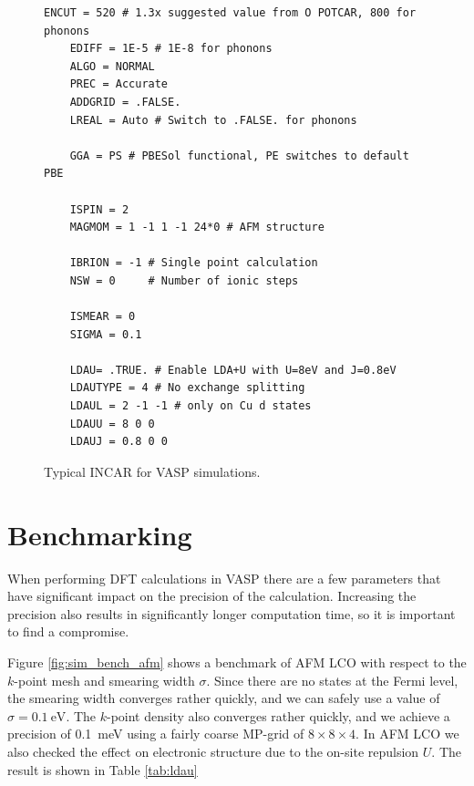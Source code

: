 \begin{figure}
    \centering
    \begin{lstlisting}[basicstyle=\footnotesize\ttfamily, frame=single]
    ENCUT = 520 # 1.3x suggested value from O POTCAR, 800 for phonons
    EDIFF = 1E-5 # 1E-8 for phonons
    ALGO = NORMAL
    PREC = Accurate
    ADDGRID = .FALSE.
    LREAL = Auto # Switch to .FALSE. for phonons
    
    GGA = PS # PBESol functional, PE switches to default PBE
    
    ISPIN = 2
    MAGMOM = 1 -1 1 -1 24*0 # AFM structure
    
    IBRION = -1 # Single point calculation
    NSW = 0     # Number of ionic steps
    
    ISMEAR = 0
    SIGMA = 0.1
    
    LDAU= .TRUE. # Enable LDA+U with U=8eV and J=0.8eV
    LDAUTYPE = 4 # No exchange splitting
    LDAUL = 2 -1 -1 # only on Cu d states
    LDAUU = 8 0 0 
    LDAUJ = 0.8 0 0
    \end{lstlisting}
    \caption[VASP: Typical INCAR]{Typical INCAR for VASP simulations.}
    \label{fig:incar}
\end{figure}

\section{Benchmarking}
When performing DFT calculations in VASP there are a few parameters that have significant impact on the precision of the calculation. Increasing the precision also results in significantly longer computation time, so it is important to find a compromise. 

Figure \ref{fig:sim_bench_afm} shows a benchmark of AFM LCO with respect to the $k$-point mesh and smearing width $\sigma$. Since there are no states at the Fermi level, the smearing width converges rather quickly, and we can safely use a value of $\sigma = \SI{0.1}{\eV}$. The $k$-point density also converges rather quickly, and we achieve a precision of \SI{0.1}{\milli\eV} using a fairly coarse MP-grid of $8\times 8 \times 4$. In AFM LCO we also checked the effect on electronic structure due to the on-site repulsion $U$. The result is shown in Table \ref{tab:ldau}

